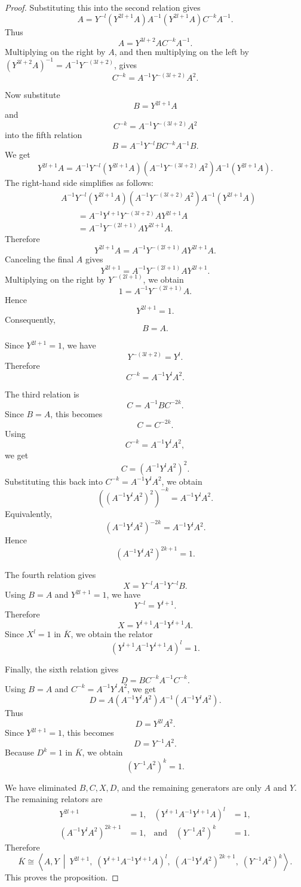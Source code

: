 \documentclass[10pt,a4paper]{amsart}
\begin{document}
\begin{proof}
Substituting this into the second relation gives
\[
A
=
Y^{-l}(Y^{2l+1}A)A^{-1}
(Y^{2l+1}A)C^{-k}A^{-1}.
\]
Thus
\[
A=Y^{3l+2}AC^{-k}A^{-1}.
\]
Multiplying on the right by \(A\), and then multiplying on the left by
\((Y^{3l+2}A)^{-1}=A^{-1}Y^{-(3l+2)}\), gives
\[
C^{-k}=A^{-1}Y^{-(3l+2)}A^2.
\]

Now substitute
\[
B=Y^{2l+1}A
\]
and
\[
C^{-k}=A^{-1}Y^{-(3l+2)}A^2
\]
into the fifth relation
\[
B=A^{-1}Y^{-l}BC^{-k}A^{-1}B.
\]
We get
\[
Y^{2l+1}A
=
A^{-1}Y^{-l}(Y^{2l+1}A)
\left(A^{-1}Y^{-(3l+2)}A^2\right)
A^{-1}(Y^{2l+1}A).
\]
The right-hand side simplifies as follows:
\[
\begin{aligned}
& A^{-1}Y^{-l}(Y^{2l+1}A)
\left(A^{-1}Y^{-(3l+2)}A^2\right)
A^{-1}(Y^{2l+1}A) \\
&\qquad =
A^{-1}Y^{l+1}Y^{-(3l+2)}AY^{2l+1}A \\
&\qquad =
A^{-1}Y^{-(2l+1)}AY^{2l+1}A .
\end{aligned}
\]
Therefore
\[
Y^{2l+1}A
=
A^{-1}Y^{-(2l+1)}AY^{2l+1}A.
\]
Canceling the final \(A\) gives
\[
Y^{2l+1}
=
A^{-1}Y^{-(2l+1)}AY^{2l+1}.
\]
Multiplying on the right by \(Y^{-(2l+1)}\), we obtain
\[
1=A^{-1}Y^{-(2l+1)}A.
\]
Hence
\[
Y^{2l+1}=1.
\]
Consequently,
\[
B=A.
\]

Since \(Y^{2l+1}=1\), we have
\[
Y^{-(3l+2)}=Y^l.
\]
Therefore
\[
C^{-k}=A^{-1}Y^lA^2.
\]

The third relation is
\[
C=A^{-1}BC^{-2k}.
\]
Since \(B=A\), this becomes
\[
C=C^{-2k}.
\]
Using
\[
C^{-k}=A^{-1}Y^lA^2,
\]
we get
\[
C=\left(A^{-1}Y^lA^2\right)^2.
\]
Substituting this back into \(C^{-k}=A^{-1}Y^lA^2\), we obtain
\[
\left(\left(A^{-1}Y^lA^2\right)^2\right)^{-k}
=
A^{-1}Y^lA^2.
\]
Equivalently,
\[
\left(A^{-1}Y^lA^2\right)^{-2k}
=
A^{-1}Y^lA^2.
\]
Hence
\[
\left(A^{-1}Y^lA^2\right)^{2k+1}=1.
\]

The fourth relation gives
\[
X=Y^{-l}A^{-1}Y^{-l}B.
\]
Using \(B=A\) and \(Y^{2l+1}=1\), we have
\[
Y^{-l}=Y^{l+1}.
\]
Therefore
\[
X=Y^{l+1}A^{-1}Y^{l+1}A.
\]
Since \(X^l=1\) in \(\overline K\), we obtain the relator
\[
\left(Y^{l+1}A^{-1}Y^{l+1}A\right)^l=1.
\]

Finally, the sixth relation gives
\[
D=BC^{-k}A^{-1}C^{-k}.
\]
Using \(B=A\) and \(C^{-k}=A^{-1}Y^lA^2\), we get
\[
D
=
A(A^{-1}Y^lA^2)A^{-1}(A^{-1}Y^lA^2).
\]
Thus
\[
D=Y^{2l}A^2.
\]
Since \(Y^{2l+1}=1\), this becomes
\[
D=Y^{-1}A^2.
\]
Because \(D^k=1\) in \(\overline K\), we obtain
\[
\left(Y^{-1}A^2\right)^k=1.
\]

We have eliminated \(B,C,X,D\), and the remaining generators are only
\(A\) and \(Y\). The remaining relators are
\[
\begin{aligned}
Y^{2l+1}&=1,&
\left(Y^{l+1}A^{-1}Y^{l+1}A\right)^l&=1,\\
\left(A^{-1}Y^lA^2\right)^{2k+1}&=1,&
\text{and}\quad \left(Y^{-1}A^2\right)^k&=1.
\end{aligned}
\]
Therefore
\[
\overline K
\cong
\left\langle A,Y \ \middle|\ 
Y^{2l+1},\;
\left(Y^{l+1}A^{-1}Y^{l+1}A\right)^l,\;
\left(A^{-1}Y^lA^2\right)^{2k+1},\;
\left(Y^{-1}A^2\right)^k
\right\rangle .
\]
This proves the proposition. 

\end{proof}
\end{document}
